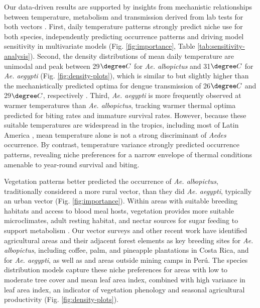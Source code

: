 Our data-driven results are supported by insights from mechanistic relationships between temperature, metabolism and transmission derived from lab tests for both vectors \cite{Mordecai2017-tb, Mordecai2019-ya}. First, daily temperature patterns strongly predict niche use for both species, independently predicting occurrence patterns and driving model sensitivity in multivariate models (Fig. \ref{fig:importance}, Table \ref{tab:sensitivity-analysis}). Second, the density distributions of mean daily temperature are unimodal and peak between 29$\degree C$ for \textit{Ae. albopictus} and 31$\degree C$ for \textit{Ae. aegypti} (Fig. \ref{fig:density-plots}), which is similar to but slightly higher than the mechanistically predicted optima for dengue transmission of 26$\degree C$ and 29$\degree C$, respectively \cite{Mordecai2017-tb}. Third, \textit{Ae. aegypti} is more frequently observed at warmer temperatures than \textit{Ae. albopictus}, tracking warmer thermal optima predicted for biting rates and immature survival rates. However, because these suitable temperatures are widespread in the tropics, including most of Latin America \cite{Brady2012-tg, Ryan2019-pz}, mean temperature alone is not a strong discriminant of \textit{Aedes} occurrence. By contrast, temperature variance strongly predicted occurrence patterns, revealing niche preferences for a narrow envelope of thermal conditions amenable to year-round survival and biting.

Vegetation patterns better predicted the occurrence of \textit{Ae. albopictus}, traditionally considered a more rural vector, than they did \textit{Ae. aegypti}, typically an urban vector (Fig. \ref{fig:importance}). Within areas with suitable breeding habitats and access to blood meal hosts, vegetation provides more suitable microclimates, adult resting habitat, and nectar sources for sugar feeding to support metabolism \cite{Marinotti1990-vx, Martinez-Ibarra1997-ra, Chen2015-dw}. Our vector surveys and other recent work \cite{Troyo2009-yv, Calderon-Arguedas2015-sz} have identified agricultural areas and their adjacent forest elements as key breeding sites for \textit{Ae. albopictus}, including coffee, palm, and pineapple plantations in Costa Rica, and for \textit{Ae. aegypti}, as well as and areas outside mining camps in Perú. The species distribution models capture these niche preferences for areas with low to moderate tree cover and mean leaf area index, combined with high variance in leaf area index, an indicator of vegetation phenology and seasonal agricultural productivity (Fig. \ref{fig:density-plots}).

